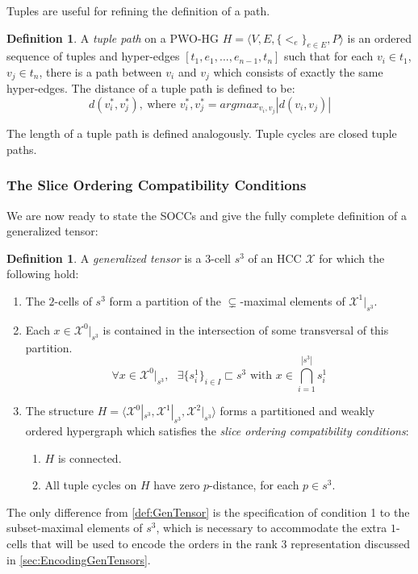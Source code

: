 \documentclass{article}
\theoremstyle{plain}
\theoremstyle{definition}
\newtheorem{definition}[theorem]{Definition}
\theoremstyle{remark}
\newcommand{\cX}{\mathcal{X}}
\begin{document}
Tuples are useful for refining the definition of a path.
\begin{definition}
	A \textit{tuple path} on a PWO-HG $H = \langle V, E, \{<_e\}_{e \in E}, P \rangle$ is an ordered sequence of tuples and hyper-edges $[t_1, e_1, ..., e_{n-1}, t_n]$ such that for each $v_i \in t_1$, $v_j \in t_n$, there is a path between $v_i$ and $v_j$ which consists of exactly the same hyper-edges. The distance of a tuple path is defined to be:
	\begin{equation*}
		d(v_i^*, v_j^*), \ \text{where } v_i^*, v_j^* = argmax_{v_i, v_j} |d(v_i, v_j)|
	\end{equation*}
\end{definition}
The length of a tuple path is defined analogously. Tuple cycles are closed tuple paths. 

\subsubsection{\label{sec:GenTenSOCC_Apdx}The Slice Ordering Compatibility Conditions}
We are now ready to state the SOCCs and give the fully complete definition of a generalized tensor:
\begin{definition}
	A \textit{generalized tensor} is a $3$-cell $s^3$ of an HCC $\cX$ for which the following hold:
	\begin{enumerate}
		\item The $2$-cells of $s^3$ form a partition of the $\subsetneq$-maximal elements of $\cX^1|_{s^3}$.
		\item Each $x \in \cX^0|_{s^3}$ is contained in the intersection of some transversal of this partition. 
		\begin{equation*}
			\forall x \in \mathcal{X}^0|_{s^3}, \text{ } \exists \{s^1_i\}_{i\in I} \sqsubset s^3 \text{ with } x \in \bigcap_{i=1}^{|s^3|} s^1_i
		\end{equation*}
		\item The structure $H = \big\langle \cX^0|_{s^3}, \cX^1|_{s^3}, \cX^2|_{s^3} \big\rangle$ forms a partitioned and weakly ordered hypergraph which satisfies the \textit{slice ordering compatibility conditions}:
		\begin{enumerate}
			\item $H$ is connected.
			\item All tuple cycles on $H$ have zero $p$-distance, for each $p \in s^3$.
		\end{enumerate}
	\end{enumerate}
	\label{def:GenTensorAppendix}
\end{definition}
The only difference from \cref{def:GenTensor} is the specification of condition 1 to the subset-maximal elements of $s^3$, which is necessary to accommodate the extra $1$-cells that will be used to encode the orders in the rank $3$ representation discussed in \cref{sec:EncodingGenTensors}.
\end{document}
